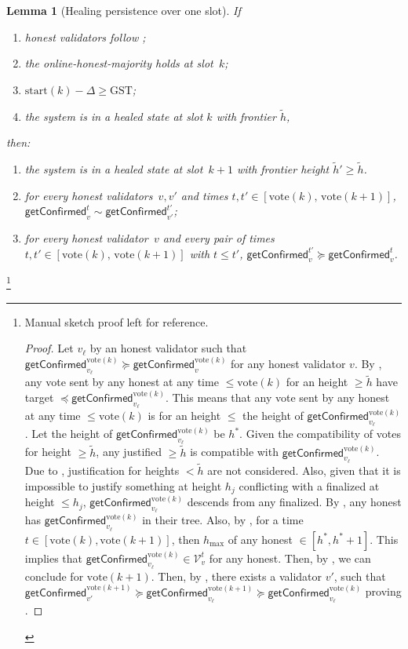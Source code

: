 \documentclass{article}
\newcommand{\V}[0]{\ensuremath{\mathcal{V}}}
\newcommand{\hmax}{\ensuremath{h_{\max}}\xspace}
\newcommand{\start}{\ensuremath{\mathrm{start}}}
\newcommand{\vote}{\ensuremath{\mathrm{vote}}}
\newcommand{\GST}{\ensuremath{\mathrm{GST}}\xspace}
\newcommand{\comm}[1]{\ensuremath{\widetilde{#1}}}
\newcommand{\getConfirmed}{\textsf{getConfirmed}\xspace}
\theoremstyle{plain}
\newtheorem{lemma}{Lemma}
\theoremstyle{definition}
\theoremstyle{remark}
\begin{document}
\begin{lemma}[Healing persistence over one slot]\label{lem:healing-persistence}
If
\begin{enumerate}
  \item\label{rev:hp:f} honest validators follow ;
  \item\label{rev:hp:ohm} the online-honest-majority holds at slot~$k$;
  \item\label{rev:hp:sync} $\start(k) - \Delta \geq \GST$;
  \item\label{rev:hp:hs} the system is in a healed state at slot $k$ with frontier $\comm{h}$,
\end{enumerate}
then:
\begin{enumerate}
  \item the system is in a healed state at slot~$k+1$ with frontier height $\comm{h}' \geq \comm{h}$.
  \item for every honest validators~$v,v'$ and times $t, t' \in [\vote(k),\, \vote(k+1)]$, $\getConfirmed_v^{t} \sim \getConfirmed_{v'}^{t'}$;
  \item for every honest validator~$v$ and every pair of times $t, t' \in [\vote(k),\, \vote(k+1)]$ with $t \leq t'$, $\getConfirmed_v^{t'} \succeq \getConfirmed_v^t$.
\end{enumerate}
\end{lemma}

\footnote{
Manual sketch proof left for reference.
\begin{proof}  
  Let $v_\ell$ by an honest validator such that $\getConfirmed_{v_\ell}^{\vote(k)}\succeq \getConfirmed_v^{\vote(k)}$ for any honest validator $v$.
  By , any vote sent by any honest at any time $\leq \vote(k)$ for an height $\geq \comm{h}$ have target $\preceq \getConfirmed_{v_\ell}^{\vote(k)}$.
  This means that any vote sent by any honest at any time $\leq \vote(k)$ is for an height $\leq $ the height of $\getConfirmed_{v_\ell}^{\vote(k)}$.
  Let the height of $\getConfirmed_{v_\ell}^{\vote(k)}$ be $h^*$.
  Given the compatibility of votes for height $\geq \comm{h}$, any justified $\geq \comm{h}$ is compatible with $\getConfirmed_{v_\ell}^{\vote(k)}$.
  Due to , justification for heights $< \comm{h}$ are not considered.
  Also, given that it is impossible to justify something at height $h_j$ conflicting with a finalized at height $\leq h_j$, $\getConfirmed_{v_\ell}^{\vote(k)}$ descends from any finalized.
  By , any honest has  $\getConfirmed_{v_\ell}^{\vote(k)}$ in their tree.
  Also, by , for a time $t \in [\vote(k),\vote(k+1)]$, then $\hmax$ of any honest  $\in [h^*,h^*+1]$. 
  This implies that  $\getConfirmed_{v_\ell}^{\vote(k)} \in \V_v^t$ for any honest.
  Then, by , we can conclude  for $\vote(k+1)$.
  Then, by , there exists a validator $v'$, such that $\getConfirmed_{v'}^{\vote(k+1)}\succeq \getConfirmed_{v_\ell}^{\vote(k+1)}\succeq \getConfirmed_{v_\ell}^{\vote(k)}$ proving .
\end{proof}}
\end{document}

